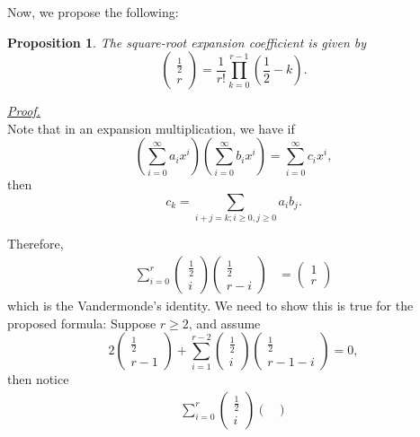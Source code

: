\documentclass[12pt]{article}
\newtheorem*{proposition}{Proposition}
\renewenvironment{proof}[1][Proof]{\begin{snugshade*} \underline{\textit{{#1}.}}\\}{\hfill \qedsymbol \end{snugshade*}}
\begin{document}
    Now, we propose the following:

    \begin{proposition}
        The square-root expansion coefficient is given by \[\begin{pmatrix}
            \frac{1}{2}\\r
        \end{pmatrix}=\frac{1}{r!}\prod_{k=0}^{r-1}(\frac{1}{2}-k).\] 
    \end{proposition}

    \begin{proof}
        Note that in an expansion multiplication, we have if \[(\sum_{i=0}^{\infty}a_i x^i)(\sum_{i=0}^{\infty}b_i x^i)=\sum_{i=0}^{\infty}c_i x^i,\] then \[c_k=\sum_{i+j=k;i\geq 0,j\geq 0}a_i b_j.\]

        Therefore, \begin{align*}
            \sum_{i=0}^r\begin{pmatrix}
                \frac{1}{2}\\i
            \end{pmatrix}\begin{pmatrix}
                \frac{1}{2}\\r-i
            \end{pmatrix}&=\begin{pmatrix}
                1\\r
            \end{pmatrix}
        \end{align*}
        which is the Vandermonde's identity. We need to show this is true for the proposed formula: Suppose $r\geq 2$, and assume \[2\begin{pmatrix}
            \frac{1}{2}\\r-1
        \end{pmatrix}+\sum_{i=1}^{r-2}\begin{pmatrix}
            \frac{1}{2}\\i
        \end{pmatrix}\begin{pmatrix}
            \frac{1}{2}\\r-1-i
        \end{pmatrix}=0,\] then notice \begin{align*}
            \sum_{i=0}^r\begin{pmatrix}
                \frac{1}{2}\\i
            \end{pmatrix}\begin{pmatrix}

\end{pmatrix}
\end{align*}
\end{proof}
\end{document}
